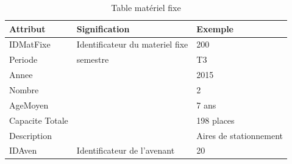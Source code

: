 \documentclass[a4paper]{report}
\begin{document}
\begin{doublespace}
	\begin{table}[H]
		\begin{center}
			\begin{tabularx}{17.5cm}{|X|X|X|}
				\hline
				\textbf{Attribut} & \textbf{Signification}          &
				\textbf{Exemple}                                                             \\
				\hline
				IDMatFixe         & Identificateur du materiel fixe & 200                    \\
				\hline
				Periode           & semestre                        & T3                     \\
				\hline
				Annee             &                                 & 2015                   \\
				\hline
				Nombre            &                                 & 2                      \\
				\hline
				AgeMoyen          &                                 & 7 ans                  \\
				\hline
				Capacite Totale   &                                 & 198 places             \\
				\hline
				Description       &                                 & Aires de stationnement \\
				\hline
				IDAven            & Identificateur de l'avenant     & 20                     \\
				\hline
			\end{tabularx}
			\caption{Table matériel fixe}
		\end{center}
	\end{table}


\end{doublespace}
\end{document}
